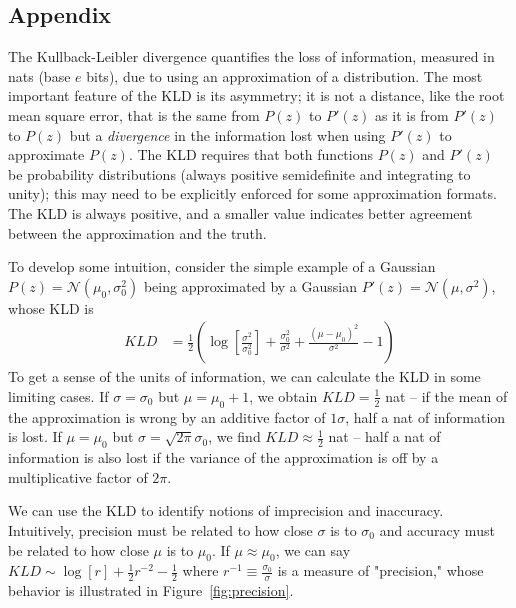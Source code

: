 \documentclass[\docopts]{\docclass}
\begin{document}
\subsection*{Appendix}
\label{sec:kld}

The Kullback-Leibler divergence quantifies the loss of information, measured in 
nats (base $e$ bits), due to using an approximation of a distribution.
The most important feature of the KLD is its asymmetry; it is not a distance, 
like the root mean square error, that is the same from $P(z)$ to $P'(z)$ as it 
is from $P'(z)$ to $P(z)$ but a \textit{divergence} in the information lost 
when using $P'(z)$ to approximate $P(z)$.
The KLD requires that both functions $P(z)$ and $P'(z)$ be probability 
distributions (always positive semidefinite and integrating to unity); this may 
need to be explicitly enforced for some approximation formats.
The KLD is always positive, and a smaller value indicates better agreement 
between the approximation and the truth.

To develop some intuition, consider the simple example of a Gaussian 
$P(z)=\mathcal{N}(\mu_{0}, \sigma_{0}^{2})$ being approximated by a Gaussian 
$P'(z)=\mathcal{N}(\mu, \sigma^{2})$, whose KLD is
\begin{align}
  \label{eq:gaussian}
  KLD &= \frac{1}{2}\left(\log\left[\frac{\sigma^{2}}{\sigma_{0}^{2}}\right] + 
\frac{\sigma_{0}^{2}}{\sigma^{2}} + \frac{(\mu-\mu_{0})^{2}}{\sigma^{2}} - 
1\right)
\end{align}
To get a sense of the units of information, we can calculate the KLD in some 
limiting cases.
If $\sigma=\sigma_{0}$ but $\mu=\mu_{0}+1$, we obtain $KLD=\frac{1}{2}$ nat -- 
if the mean of the approximation is wrong by an additive factor of $1\sigma$, 
half a nat of information is lost.
If $\mu=\mu_{0}$ but $\sigma=\sqrt{2\pi}\sigma_{0}$, we find 
$KLD\approx\frac{1}{2}$ nat -- half a nat of information is also lost if the 
variance of the approximation is off by a multiplicative factor of $2\pi$.

We can use the KLD to identify notions of imprecision and inaccuracy.
Intuitively, precision must be related to how close $\sigma$ is to $\sigma_{0}$ 
and accuracy must be related to how close $\mu$ is to $\mu_{0}$.
If $\mu\approx\mu_{0}$, we can say $KLD\sim\log[r] + \frac{1}{2}r^{-2} - 
\frac{1}{2}$ where $r^{-1}\equiv\frac{\sigma_{0}}{\sigma}$ is a measure of 
"precision," whose behavior is illustrated in Figure~\ref{fig:precision}.
\end{document}

